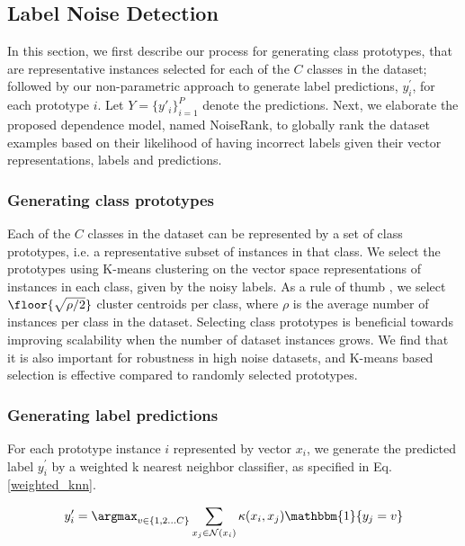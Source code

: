 \subsection {Label Noise Detection}



In this section, we first describe our process for generating class prototypes, that are representative instances selected for each of the $C$ classes in the dataset; followed by our non-parametric approach to generate label predictions, $y_i^\prime$, for each prototype $i$. Let $Y = \{y'_i\}_{i=1}^P$ denote the predictions. Next, we elaborate the proposed dependence model, named NoiseRank, to globally rank the dataset examples based on their likelihood of having incorrect labels given their vector representations, labels and predictions. 





\subsubsection {Generating class prototypes} 
\label{sec:class_prototypes} Each of the $C$ classes in the dataset can be represented by a set of class prototypes, i.e. a representative subset of instances in that class. We select the prototypes using K-means clustering on the vector space representations of instances in each class, given by the noisy labels. As a rule of thumb \cite{kodinariya2013review}, we select $\floor{\sqrt{\rho/2}}$ cluster centroids per class, where $\rho$ is the average number of instances per class in the dataset. Selecting class prototypes is beneficial towards improving scalability when the number of dataset instances grows.
We find that it is also important for robustness in high noise datasets, and K-means based selection is effective compared to randomly selected prototypes.

\subsubsection {Generating label predictions} 
\label{sec:label_pred} For each prototype instance $i$ represented by vector $x_i$, we generate the predicted label  $y_i^\prime$ by a weighted k nearest neighbor classifier, as specified in Eq. \ref{weighted_knn}.

\begin{equation}\label{weighted_knn}
    y_i^\prime = \argmax_{v \in \{1,2\dots C\}} \sum_{x_j \in \mathcal{N}(x_i)} \kappa(x_i, x_j) \mathbbm{1}\{y_j=v\}
\end{equation}

